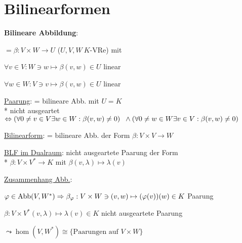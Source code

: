 \section{\label{sec:bilinearformen}Bilinearformen}

\textbf{Bilineare Abbildung}:
\begin{items}
	\item \( = \beta: V \times W \to U \) (\( U,V,W \ K \)-VRe) mit
	\begin{enumeration}
		\item \( \forall v \in V: W \ni w \mapsto \beta(v,w) \in U \) linear
		\item \( \forall w \in W: V \ni v \mapsto \beta(v,w) \in U \) linear
	\end{enumeration}

	\item \underline{Paarung}: = bilineare Abb. mit \( U=K \)
		\\*
		nicht ausgeartet \( \Leftrightarrow (\forall 0 \neq v \in V \exists w \in W: \beta(v,w) \neq 0 ) \\* \phantom{x} \wedge (\forall 0 \neq w \in W \exists v \in V: \beta(v,w) \neq 0 ) \)

	\item \underline{Bilinearform}: = bilineare Abb. der Form \( \beta: V \times V \to W \)

	\item \underline{BLF im Dualraum}: nicht ausgeartete Paarung der Form \\* \( \beta: V \times V^\ast \to K \) mit \( \beta(v, \lambda) \mapsto \lambda(v) \)

	\item \underline{Zusammenhang Abb.}:
		\begin{enumeration}
		 	\item \( \varphi \in \text{Abb}(V,W^\ast) \\* \Rightarrow \beta_\varphi: V \times W \ni (v,w) \mapsto (\varphi(v))(w) \in K \) Paarung
		 	\item \( \beta: V \times V^\ast (v, \lambda) \mapsto \lambda(v) \in K \) nicht ausgeartete Paarung
		 \end{enumeration} 
		 \( \leadsto \hom(V,W^\ast) \cong \{ \text{Paarungen auf } V \times W \} \)
\end{items}

